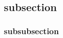 \cite{sundermeyer2021contact}
\cite{kumra2020antipodal}

\subsection{subsection}

\subsubsection{subsubsection}


